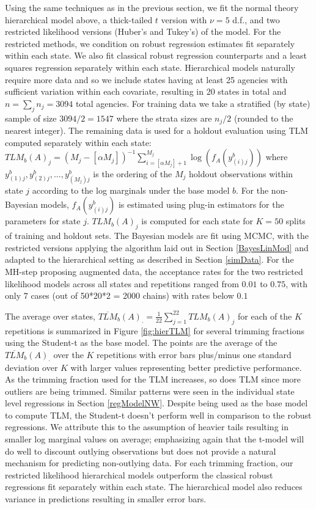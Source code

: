 \documentclass[ba]{imsart}
\newcommand{\response}[1]{{\color{blue}#1}}
\begin{document}
Using the same techniques as in the previous section, 
we fit the normal theory hierarchical model above, a thick-tailed $t$ version with $\nu = 5$ d.f., and two restricted likelihood versions (Huber's and Tukey's) of the model.  For the restricted methods, we condition on robust regression estimates fit separately within each state. We also fit classical robust regression counterparts and a least squares regression separately within each state. Hierarchical models naturally require more
data and so we include states having at least 25 agencies with sufficient variation within each covariate, resulting in 20 states in total and $n = \sum_{j} n_{j} =  3094$ total agencies. For training data we take a stratified (by state) sample of size $3094/2 = 1547$ where the strata sizes are $n_{j}/2$ (rounded to the nearest integer). The remaining data is used for a holdout evaluation using TLM computed separately within each state: $TLM_b(A)_{j} = (M_{j} - [\alpha M_{j}])^{-1} \sum_{i=[\alpha M_{j}]+1}^{M_{j}} \log(f_A(y_{(i)j}^b))$ where $y_{(1)j}^b, y_{(2)j}^b,..., y_{(M_{j})j}^b$ is the ordering of the $M_{j}$ holdout observations within state $j$ according to the log marginals under the base model $b$. For the non-Bayesian models,  $f_A(y^b_{(i)j})$ is estimated using plug-in estimators for the parameters for state $j$. $TLM_b(A)_{j}$ is computed for each state for $K=50$ splits of training and holdout sets. The Bayesian models are fit using MCMC, with the restricted versions applying the algorithm laid out in Section \ref{BayesLinMod} and adapted to the hierarchical setting as described in Section \ref{simData}. For the MH-step proposing augmented data,  \response{the acceptance rates for the two restricted likelihood models across all states and repetitions ranged from $0.01$ to  $0.75$, with only $7$ cases (out of 50*20*2 = 2000 chains) with rates below $0.1$}


The average over states, $\overline{TLM}_b(A)_{\cdot}= \frac{1}{22} \sum_{j =1}^{22} TLM_b(A)_{j}$ for each of the $K$ repetitions is summarized in Figure
\ref{fig:hierTLM} for several trimming fractions using the Student-t as the base model. The points are the average of the $\overline{TLM}_b(A)_{\cdot}$ over the $K$ repetitions with error bars plus/minus one standard deviation over $K$ with larger values representing better predictive performance. As the trimming fraction used for the TLM increases, so does TLM since more outliers are being trimmed. Similar patterns were seen in the individual state level regressions in Section \ref{regModelNW}. Despite being used as the base model to compute TLM, the Student-t doesn't perform well in comparison to the robust regressions. We attribute this to the assumption of heavier tails resulting in smaller log marginal values on average; emphasizing again that the t-model will do well to discount outlying observations but does not provide a natural mechanism for predicting non-outlying data. For each trimming fraction, our restricted likelihood hierarchical models outperform the classical robust regressions fit separately within each state. The hierarchical model also reduces variance in predictions resulting in smaller error bars. 
\end{document}
